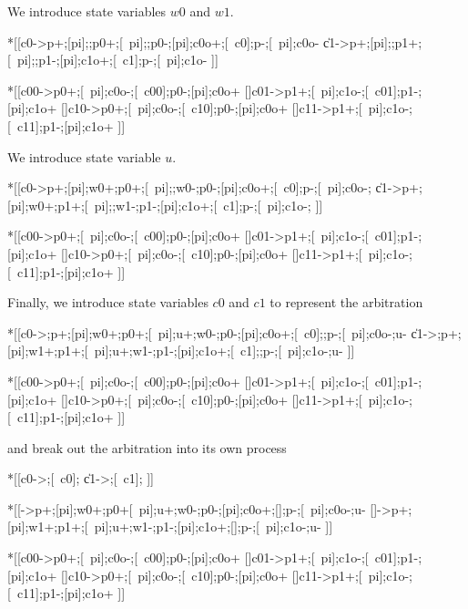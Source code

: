 \documentclass{article}
\begin{document}
\noindent
We introduce state variables $w0$ and $w1$.

\begin{hse}
*[[c0\phi->p\phi+;[pi];;p0+;[~pi];;p0-;[pi];c0o+;[~c0\phi];p\phi-;[~pi];c0o-
  \|c1\phi->p\phi+;[pi];;p1+;[~pi];;p1-;[pi];c1o+;[~c1\phi];p\phi-;[~pi];c1o-
 ]]

*[[c00->p0+;[~pi];c0o-;[~c00];p0-;[pi];c0o+
  []c01->p1+;[~pi];c1o-;[~c01];p1-;[pi];c1o+
  []c10->p0+;[~pi];c0o-;[~c10];p0-;[pi];c0o+
  []c11->p1+;[~pi];c1o-;[~c11];p1-;[pi];c1o+
 ]]
\end{hse}

\noindent
We introduce state variable $u$.

\begin{hse}
*[[c0\phi->p\phi+;[pi];w0+;p0+;[~pi];;w0-;p0-;[pi];c0o+;[~c0\phi];p\phi-;[~pi];c0o-;
  \|c1\phi->p\phi+;[pi];w0+;p1+;[~pi];;w1-;p1-;[pi];c1o+;[~c1\phi];p\phi-;[~pi];c1o-;
 ]]

*[[c00->p0+;[~pi];c0o-;[~c00];p0-;[pi];c0o+
  []c01->p1+;[~pi];c1o-;[~c01];p1-;[pi];c1o+
  []c10->p0+;[~pi];c0o-;[~c10];p0-;[pi];c0o+
  []c11->p1+;[~pi];c1o-;[~c11];p1-;[pi];c1o+
 ]]
\end{hse}

\noindent
Finally, we introduce state variables $c0$ and $c1$ to represent the arbitration

\begin{hse}
*[[c0\phi->;p\phi+;[pi];w0+;p0+;[~pi];u+;w0-;p0-;[pi];c0o+;[~c0\phi];;p\phi-;[~pi];c0o-;u-
  \|c1\phi->;p\phi+;[pi];w1+;p1+;[~pi];u+;w1-;p1-;[pi];c1o+;[~c1\phi];;p\phi-;[~pi];c1o-;u-
 ]]

*[[c00->p0+;[~pi];c0o-;[~c00];p0-;[pi];c0o+
  []c01->p1+;[~pi];c1o-;[~c01];p1-;[pi];c1o+
  []c10->p0+;[~pi];c0o-;[~c10];p0-;[pi];c0o+
  []c11->p1+;[~pi];c1o-;[~c11];p1-;[pi];c1o+
 ]]
\end{hse}


\noindent
and break out the arbitration into its own process

\begin{hse}
*[[c0\phi->;[~c0\phi];
  \|c1\phi->;[~c1\phi];
 ]]

*[[->p\phi+;[pi];w0+;p0+[~pi];u+;w0-;p0-;[pi];c0o+;[];p\phi-;[~pi];c0o-;u-
  []->p\phi+;[pi];w1+;p1+;[~pi];u+;w1-;p1-;[pi];c1o+;[];p\phi-;[~pi];c1o-;u-
 ]]

*[[c00->p0+;[~pi];c0o-;[~c00];p0-;[pi];c0o+
  []c01->p1+;[~pi];c1o-;[~c01];p1-;[pi];c1o+
  []c10->p0+;[~pi];c0o-;[~c10];p0-;[pi];c0o+
  []c11->p1+;[~pi];c1o-;[~c11];p1-;[pi];c1o+
 ]]
\end{hse}
\end{document}

